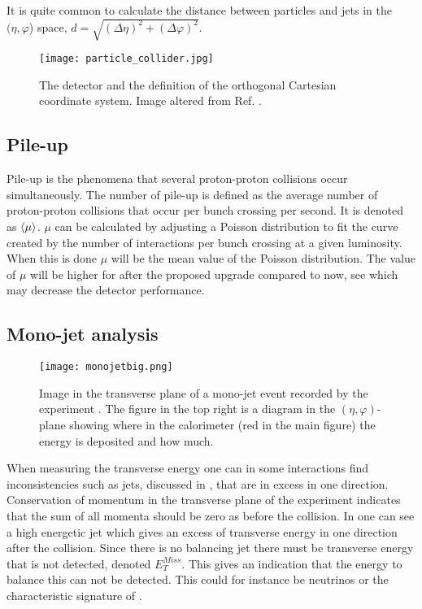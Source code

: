 It is quite common to calculate the distance between particles and jets in the $(\eta,\varphi$) space, $d=\sqrt{(\Delta \eta)^2 + (\Delta \varphi)^2}$. 

\begin{figure}[ht]
\begin{center}
\texttt{[image: particle\_collider.jpg]}
\caption{The \abbrATLAS detector and the definition of the orthogonal Cartesian coordinate system. Image altered from Ref. \citep{coordimage}.}
\label{fig:coordinatesystem}
\end{center}
\end{figure}

\subsection{Pile-up}\label{sec:eo:subsec:pile}

Pile-up is the phenomena that several proton-proton collisions occur simultaneously. The number of pile-up is defined as the average number of proton-proton collisions that occur per bunch crossing per second. It is denoted as $\left<\mu\right>$. $\mu$ can be calculated by adjusting a Poisson distribution to fit the curve created by the number of interactions per bunch crossing at a given luminosity. When this is done $\mu$ will be the mean value of the Poisson distribution. The value of $\mu$ will be higher for after the proposed upgrade compared to now, see  which may decrease the detector performance.

\subsection{Mono-jet analysis}\label{sec:eo:subsec:mjet}

\begin{figure}[ht]
\texttt{[image: monojetbig.png]}
\caption{Image in the transverse plane of a mono-jet event recorded by the \abbrATLAS experiment \citep{monojet}. The figure in the top right is a diagram in the $(\eta,\varphi)$-plane showing where in the calorimeter (red in the main figure) the energy is deposited and how much.}
\label{fig:monojet}
\end{figure}

When measuring the transverse energy one can in some interactions find inconsistencies such as jets, discussed in , that are in excess in one direction. Conservation of momentum in the transverse plane of the experiment indicates that the sum of all momenta should be zero as before the collision. In  one can see a high energetic jet which gives an excess of transverse energy in one direction after the collision. Since there is no balancing jet there must be transverse energy that is not detected, denoted $E_T^{Miss}$. This gives an indication that the energy to balance this can not be detected. This could for instance be neutrinos or the characteristic signature of \abbrWIMPS .

